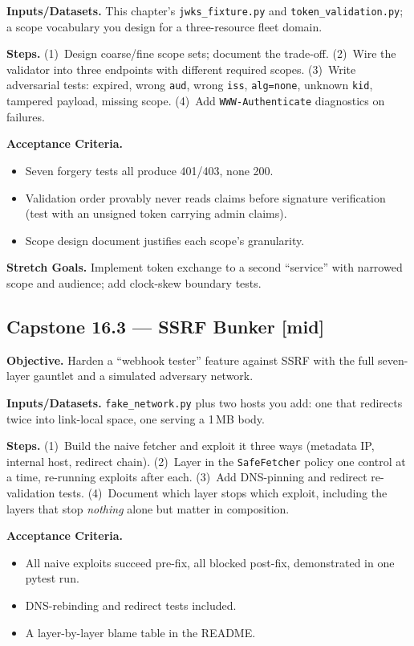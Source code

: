 \textbf{Inputs/Datasets.} This chapter's \texttt{jwks\_fixture.py} and
\texttt{token\_validation.py}; a scope vocabulary you design for a
three-resource fleet domain.

\textbf{Steps.} (1)~Design coarse/fine scope sets; document the trade-off.
(2)~Wire the validator into three endpoints with different required scopes.
(3)~Write adversarial tests: expired, wrong \texttt{aud}, wrong
\texttt{iss}, \texttt{alg=none}, unknown \texttt{kid}, tampered payload,
missing scope. (4)~Add \texttt{WWW-Authenticate} diagnostics on failures.

\textbf{Acceptance Criteria.}
\begin{itemize}[itemsep=0.2em]
  \item[$\square$] Seven forgery tests all produce 401/403, none 200.
  \item[$\square$] Validation order provably never reads claims before
        signature verification (test with an unsigned token carrying
        admin claims).
  \item[$\square$] Scope design document justifies each scope's
        granularity.
\end{itemize}

\textbf{Stretch Goals.} Implement token exchange to a second ``service''
with narrowed scope and audience; add clock-skew boundary tests.

\subsection*{Capstone 16.3 --- SSRF Bunker \textbf{[mid]}}

\textbf{Objective.} Harden a ``webhook tester'' feature against SSRF with
the full seven-layer gauntlet and a simulated adversary network.

\textbf{Inputs/Datasets.} \texttt{fake\_network.py} plus two hosts you add:
one that redirects twice into link-local space, one serving a 1\,MB body.

\textbf{Steps.} (1)~Build the naive fetcher and exploit it three ways
(metadata IP, internal host, redirect chain). (2)~Layer in the
\texttt{SafeFetcher} policy one control at a time, re-running exploits
after each. (3)~Add DNS-pinning and redirect re-validation tests.
(4)~Document which layer stops which exploit, including the layers that
stop \emph{nothing} alone but matter in composition.

\textbf{Acceptance Criteria.}
\begin{itemize}[itemsep=0.2em]
  \item[$\square$] All naive exploits succeed pre-fix, all blocked
        post-fix, demonstrated in one pytest run.
  \item[$\square$] DNS-rebinding and redirect tests included.
  \item[$\square$] A layer-by-layer blame table in the README.
\end{itemize}

